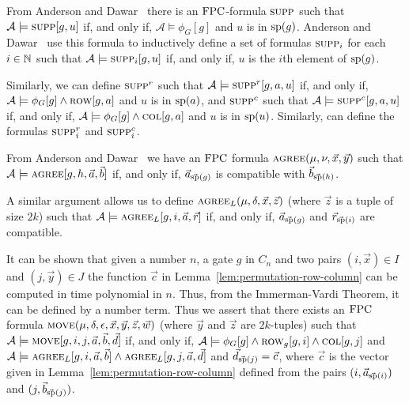 \documentclass[../paper.tex]{subfiles}
\begin{document}

From Anderson and Dawar~\cite{AndersonD17} there is an $\text{\upshape FPC}$-formula
$\textsc{supp}$ such that $\mathcal{A} \models \textsc{supp} [g, u]$ if, and only if,
$\mathcal{A} \models \phi_G [g]$ and $u$ is in $\text{sp}(g)$. Anderson and
Dawar~\cite{AndersonD17} use this formula to inductively define a set of
formulas $\textsc{supp}_i$ for each $i \in \mathbb{N}$ such that $\mathcal{A} \models
\textsc{supp}_i[g, u]$ if, and only if, $u$ is the $i$th element of $\text{sp}(g)$.

Similarly, we can define $\textsc{supp}^r$ such that $\mathcal{A} \models
\textsc{supp}^r[g, a, u]$ if, and only if, $\mathcal{A} \models \phi_G [g] \land
\textsc{row}[g, a]$ and $u$ is in $\text{sp}(a)$, and $\textsc{supp}^c$ such that
$\mathcal{A} \models \textsc{supp}^c[g, a, u]$ if, and only if, $\mathcal{A} \models
\phi_G [g] \land \textsc{col}[g, a]$ and $u$ is in $\text{sp}(u)$. Similarly, can
define the formulas $\textsc{supp}^r_i$ and $\textsc{supp}^c_i$.

From Anderson and Dawar~\cite{AndersonD17} we have an $\text{\upshape FPC}$ formula
$\textsc{agree}(\mu, \nu, \vec{x}, \vec{y})$ such that $\mathcal{A} \models
\textsc{agree}[g, h, \vec{a}, \vec{b}]$ if, and only if, $\vec{a}_{\vec{\text{sp}}(g)}$
is compatible with $\vec{b}_{\vec{\text{sp}}(h)}$.


A similar argument allows us to define $\textsc{agree}_L (\mu, \delta , \vec{x},
\vec{z})$ (where $\vec{z}$ is a tuple of size $2k$) such that $\mathcal{A}
\models \textsc{agree}_L [g, i, \vec{a}, \vec{r}]$ if, and only if,
$\vec{a}_{\vec{\text{sp}}(g)}$ and $\vec{r}_{\vec{\text{sp}}(i)}$ are compatible.

It can be shown that given a number $n$, a gate $g$ in $C_n$ and two pairs $(i,
\vec{x}) \in I$ and $(j, \vec{y}) \in J$ the function $\vec{c}$ in
Lemma~\ref{lem:permutation-row-column} can be computed in time polynomial in
$n$. Thus, from the Immerman-Vardi Theorem, it can be defined by a number term.
Thus we assert that there exists an $\text{\upshape FPC}$ formula $\textsc{move} (\mu, \delta,
\epsilon, \vec{x}, \vec{y}, \vec{z}, \vec{w})$ (where $\vec{y}$ and $\vec{z}$
are $2k$-tuples) such that $\mathcal{A} \models \textsc{move} [g, i, j, \vec{a},
\vec{b}, \vec{d}]$ if, and only if, $\mathcal{A} \models \phi_G [g] \land
\textsc{row}_g[g,i] \land \textsc{col}[g, j]$ and $\mathcal{A} \models \textsc{agree}_L [g,
i, \vec{a}, \vec{b}] \land \textsc{agree}_L [g, j, \vec{a}, \vec{d}]$ and
$\vec{d}_{\vec{\text{sp}}(j)} = \vec{c}$, where $\vec{c}$ is the vector given in
Lemma~\ref{lem:permutation-row-column} defined from the pairs $(i,
\vec{a}_{\vec{\text{sp}}(i)})$ and $(j, \vec{b}_{\vec{\text{sp}}(j)})$.
\end{document}
